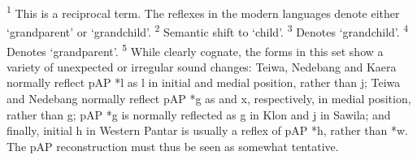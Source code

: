 \textsuperscript{1} This is a reciprocal term. The reflexes in the modern languages denote either `grandparent' or `grandchild'.  \textsuperscript{2} Semantic shift to `child'.  \textsuperscript{3} Denotes `grandchild'.  \textsuperscript{4} Denotes `grandparent'.  \textsuperscript{5} While clearly cognate, the forms in this set show a variety of unexpected or irregular sound changes: Teiwa, Nedebang and Kaera normally reflect pAP *l as l in initial and medial position, rather than j; Teiwa and Nedebang normally reflect pAP *g as {\pharfric} and x, respectively, in medial position, rather than g; pAP *g is normally reflected as g in Klon and j in Sawila; and finally, initial h in Western Pantar is usually a reflex of pAP *h, rather than *w. The pAP reconstruction must thus be seen as somewhat tentative.






